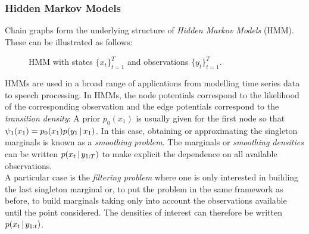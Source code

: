 \subsubsection{Hidden Markov Models}
Chain graphs form the underlying structure of \emph{Hidden Markov Models} (HMM). These can be illustrated as follows:
\begin{figure}[!h]
\center
{}
\caption{\label{fig: hmm1} HMM with states $\{x_{t}\}_{t=1}^{T}$ and observations $\{y_{t}\}_{t=1}^{T}$.}
\end{figure}

HMMs are used in a broad range of applications from modelling time series data to speech processing. In HMMs, the node potentials correspond to the likelihood of the corresponding observation and the edge potentials correspond to the \emph{transition density}:
A prior $p_{0}(x_{1})$ is usually given for the first node so that $\psi_1(x_1) = p_{0}(x_1)p(y_1\,|\, x_1)$. In this case, obtaining or approximating the singleton marginals is known as a \emph{smoothing problem}. The marginals or \emph{smoothing densities} can be written $p(x_t\,|\, y_{1:T})$ to make explicit the dependence on all available observations.\\

A particular case is the \emph{filtering problem} where one is only interested in building the last singleton marginal or, to put the problem in the same framework as before, to build marginals taking only into account the observations available until the point considered. The densities of interest can therefore be written $p(x_t\,|\, y_{1:t})$.\\ 

